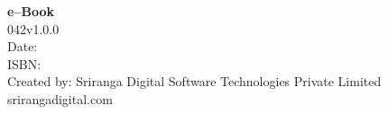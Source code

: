 \thispagestyle{empty}

 \textbf{e–Book}\\
 042v1.0.0\\
 Date: \\
 ISBN: \\
 Created by: Sriranga Digital Software Technologies Private Limited\\srirangadigital.com

